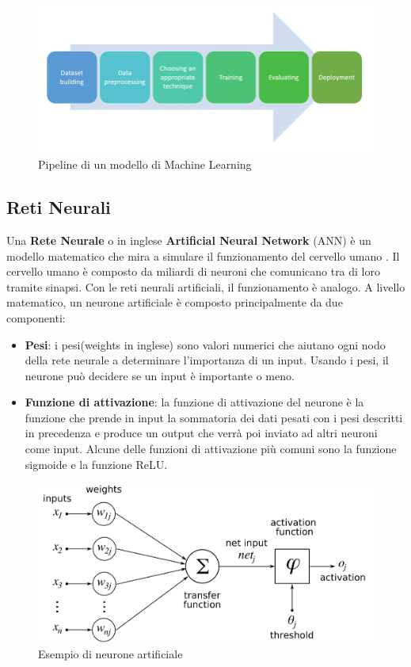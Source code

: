 \documentclass[12pt,a4paper,openright,twoside]{book}
\begin{document}
\begin{figure}[H]
    \centering
    \includegraphics[width=.8\linewidth]{figures/Machine-learning-pipeline.png}
    \caption{Pipeline di un modello di Machine Learning \cite{phdthesishamza}}
    \label{fig:ML pipeline}
\end{figure}

\subsection{Reti Neurali}

Una \textbf{Rete Neurale} o in inglese \textbf{Artificial Neural Network} (ANN) è
un modello matematico che mira a simulare il
funzionamento del cervello umano \cite{zou2009overview}.
Il cervello umano è composto da miliardi di neuroni
che comunicano tra di loro tramite sinapsi.
Con le reti neurali artificiali, il funzionamento
è analogo. A livello matematico, un neurone artificiale è composto principalmente
da due componenti:
\begin{itemize}
    \item \textbf{Pesi}: i pesi(weights in inglese) sono valori numerici che
    aiutano ogni nodo della rete neurale a determinare
    l'importanza di un input. Usando i pesi, il neurone
    può decidere se un input è importante o meno.
    \item \textbf{Funzione di attivazione}: la funzione di attivazione del neurone è la funzione
    che prende in input la sommatoria dei dati pesati con i pesi descritti in
    precedenza e produce un output che verrà poi inviato ad altri neuroni come
    input. Alcune delle funzioni di attivazione più comuni sono la funzione
    sigmoide e la funzione ReLU.
\end{itemize}

\begin{figure}[H]
    \centering
    \includegraphics[width=.8\linewidth]{figures/ArtificialNeuronModel.png}
    \caption{Esempio di neurone artificiale \cite{wiki:xxx}}
    \label{fig:AN}
\end{figure}
\end{document}
